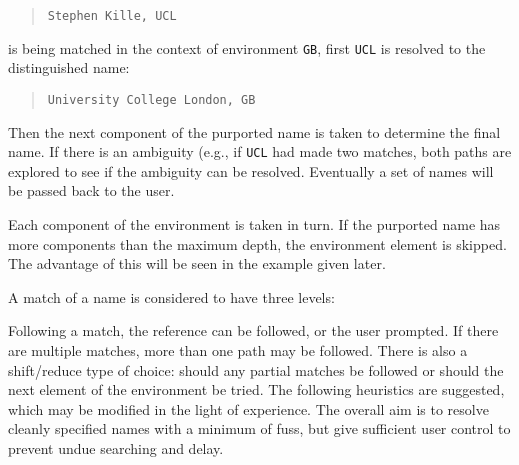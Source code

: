 \begin{quote}
\begin{verbatim}
Stephen Kille, UCL
\end{verbatim}
\end{quote}

is being matched in the context of environment \verb|GB|, first \verb|UCL|
is resolved to the distinguished name:

\begin{quote}
\begin{verbatim}
University College London, GB
\end{verbatim}
\end{quote}

Then the next component of the purported name is taken to determine the
final name. 
If there is an ambiguity (e.g., if \verb|UCL| had made two matches,
both paths are explored to see if the ambiguity can
be resolved.  Eventually a set of names will be passed back to the user.


Each component of the environment is taken in turn.
If the purported name has more
components than the maximum depth, the environment element is skipped.  
The advantage of this will be seen in the example given later.






A match of a name is considered to have three levels:


Following a match, the reference can be followed, or the user prompted.
If there are multiple matches, more than one path may be followed.
There is also a shift/reduce type of choice: should any partial matches be
followed or should the next element of the environment be tried.
The following heuristics are suggested, which may be modified in the light
of experience.  The overall aim is to resolve cleanly specified names with a
minimum of fuss, but give sufficient user control to prevent undue searching
and delay.   

